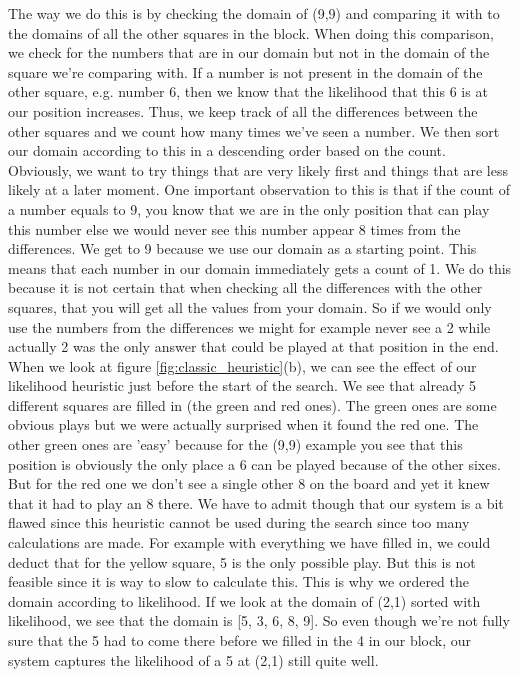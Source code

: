 \documentclass{report}
\begin{document}
The way we do this is by checking the domain of (9,9) and comparing it with to the domains of all the other squares in the block. When doing this comparison, we check for the numbers that are in our domain but not in the domain of the square we're comparing with. If a number is not present in the domain of the other square, e.g. number 6, then we know that the likelihood that this 6 is at our position increases. Thus, we keep track of all the differences between the other squares and we count how many times we've seen a number. We then sort our domain according to this in a descending order based on the count. Obviously, we want to try things that are very likely first and things that are less likely at a later moment. One important observation to this is that if the count of a number equals to 9, you know that we are in the only position that can play this number else we would never see this number appear 8 times from the differences. We get to 9 because we use our domain as a starting point. This means that each number in our domain immediately gets a count of 1. We do this because it is not certain that when checking all the differences with the other squares, that you will get all the values from your domain. So if we would only use the numbers from the differences we might for example never see a 2 while actually 2 was the only answer that could be played at that position in the end.
\newline
\newline
When we look at figure \ref{fig:classic_heuristic}(b), we can see the effect of our likelihood heuristic just before the start of the search. We see that already 5 different squares are filled in (the green and red ones). The green ones are some obvious plays but we were actually surprised when it found the red one. The other green ones are 'easy' because for the (9,9) example you see that this position is obviously the only place a 6 can be played because of the other sixes. But for the red one we don't see a single other 8 on the board and yet it knew that it had to play an 8 there. We have to admit though that our system is a bit flawed since this heuristic cannot be used during the search since too many calculations are made. For example with everything we have filled in, we could deduct that for the yellow square, 5 is the only possible play. But this is not feasible since it is way to slow to calculate this. This is why we ordered the domain according to likelihood. If we look at the domain of (2,1) sorted with likelihood, we see that the domain is [5, 3, 6, 8, 9]. So even though we're not fully sure that the 5 had to come there before we filled in the 4 in our block, our system captures the likelihood of a 5 at (2,1) still quite well.
\end{document}
